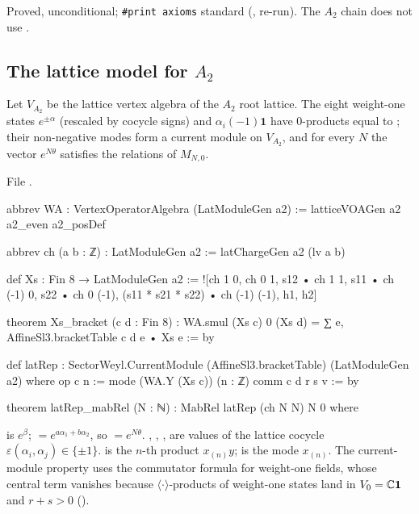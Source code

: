 \begin{status}
Proved, unconditional; \texttt{\#print axioms} standard (,
 re-run). The $A_2$ chain does not use .
\end{status}

\subsection{The lattice model for $A_2$}

\begin{theorem}\label{l26:thm:latrep}
Let $V_{A_2}$ be the lattice vertex algebra of the $A_2$ root lattice. The eight weight-one states
$e^{\pm\alpha}$ (rescaled by cocycle signs) and $\alpha_i(-1)\mathbf 1$ have $0$-products equal to ; their
non-negative modes form a current module  on $V_{A_2}$, and for every $N$ the vector $e^{N\theta}$ satisfies the
relations of $M_{N,0}$.
\end{theorem}
\noindent File .
\begin{leancode}
abbrev WA : VertexOperatorAlgebra (LatModuleGen a2) := latticeVOAGen a2 a2_even a2_posDef

abbrev ch (a b : ℤ) : LatModuleGen a2 := latChargeGen a2 (lv a b)

def Xs : Fin 8 → LatModuleGen a2 :=
  ![ch 1 0, ch 0 1, s12 • ch 1 1, s11 • ch (-1) 0, s22 • ch 0 (-1),
    (s11 * s21 * s22) • ch (-1) (-1), h1, h2]

theorem Xs_bracket (c d : Fin 8) :
    WA.smul (Xs c) 0 (Xs d) = ∑ e, AffineSl3.bracketTable c d e • Xs e := by

def latRep : SectorWeyl.CurrentModule (AffineSl3.bracketTable) (LatModuleGen a2) where
  op c n := mode (WA.Y (Xs c)) (n : ℤ)
  comm c d r s v := by
\end{leancode}
\begin{leancode}
theorem latRep_mabRel (N : ℕ) : MabRel latRep (ch N N) N 0 where
\end{leancode}

\begin{dictionary}
 is $e^\beta$; $=e^{a\alpha_1+b\alpha_2}$, so $=e^{N\theta}$. , ,
,  are values of the lattice cocycle $\varepsilon(\alpha_i,\alpha_j)\in\{\pm1\}$.  is the
$n$-th product $x_{(n)}y$;  is the mode $x_{(n)}$. The current-module property uses the commutator
formula for weight-one fields, whose central term vanishes because $\langle\cdot\rangle$-products of weight-one states land in
$V_0={\mathbb{C}}\mathbf 1$ and $r+s>0$ ().
\end{dictionary}

